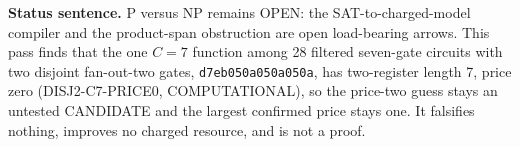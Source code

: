\documentclass[11pt]{article}
\begin{document}
\bigskip
\noindent\textbf{Status sentence.} P versus NP remains OPEN: the SAT-to-charged-model compiler and the product-span obstruction are open load-bearing arrows. This pass finds that the one $C=7$ function among 28 filtered seven-gate circuits with two disjoint fan-out-two gates, \texttt{d7eb050a050a050a}, has two-register length 7, price zero (DISJ2-C7-PRICE0, COMPUTATIONAL), so the price-two guess stays an untested CANDIDATE and the largest confirmed price stays one. It falsifies nothing, improves no charged resource, and is not a proof.
\end{document}
